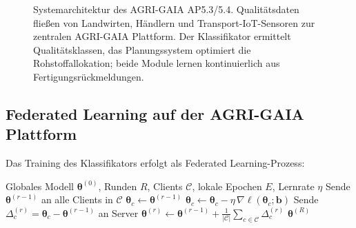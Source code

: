 ﻿\documentclass[12pt,a4paper]{article}
\theoremstyle{plain}
\theoremstyle{definition}
\begin{document}
\begin{figure}[h]
		\caption{Systemarchitektur des AGRI-GAIA AP5.3/5.4. Qualitätsdaten fließen
			von Landwirten, Händlern und Transport-IoT-Sensoren zur zentralen
			AGRI-GAIA Plattform. Der Klassifikator ermittelt Qualitätsklassen,
			das Planungssystem optimiert die Rohstoffallokation; beide Module
			lernen kontinuierlich aus Fertigungsrückmeldungen.}
		\label{fig:architektur}
	\end{figure}
	
	\subsection{Federated Learning auf der AGRI-GAIA Plattform}
	
	Das Training des Klassifikators erfolgt als Federated Learning-Prozess:
	
	\begin{algorithm}[h]
		\caption{Federated Training des Kartoffel-Klassifikators (FedAvg)}
		\label{alg:fedavg}
		\begin{algorithmic}[1]
			\Require Globales Modell $\boldsymbol{\theta}^{(0)}$, Runden $R$,
			Clients $\mathcal{C}$, lokale Epochen $E$, Lernrate $\eta$
			\State Sende $\boldsymbol{\theta}^{(r-1)}$ an alle Clients in $\mathcal{C}$
			\State $\boldsymbol{\theta}_c \gets \boldsymbol{\theta}^{(r-1)}$
			\State $\boldsymbol{\theta}_c \gets \boldsymbol{\theta}_c -
			\eta\,\nabla\ell(\boldsymbol{\theta}_c; \mathbf{b})$
			\EndFor
			\EndFor
			\State Sende $\Delta_c^{(r)} = \boldsymbol{\theta}_c -
			\boldsymbol{\theta}^{(r-1)}$ an Server
			\EndFor
			\State $\boldsymbol{\theta}^{(r)} \gets \boldsymbol{\theta}^{(r-1)} +
			\frac{1}{|\mathcal{C}|} \sum_{c \in \mathcal{C}} \Delta_c^{(r)}$
			\EndFor
			\State \Return $\boldsymbol{\theta}^{(R)}$
		\end{algorithmic}
	\end{algorithm}
	
\end{document}
